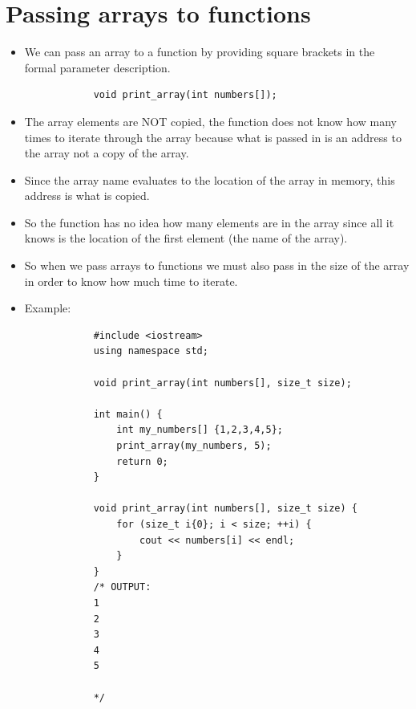 \section{Passing arrays to functions}
\begin{itemize}
    \item We can pass an array to a function by providing square brackets in the formal parameter description.
        \begin{verbatim}
            void print_array(int numbers[]);
        \end{verbatim}
    
    \item The array elements are NOT copied, the function does not know how many times to iterate through the array because what is passed in is an address to the array not a copy of the array.
    \item Since the array name evaluates to the location of the array in memory, this address is what is copied.
    \item So the function has no idea how many elements are in the array since all it knows is the location of the first element (the name of the array).
    \item So when we pass arrays to functions we must also pass in the size of the array in order to know how much time to iterate.
    \item Example:
        \begin{verbatim}
            #include <iostream>
            using namespace std;

            void print_array(int numbers[], size_t size);

            int main() {
                int my_numbers[] {1,2,3,4,5};
                print_array(my_numbers, 5);
                return 0;
            }

            void print_array(int numbers[], size_t size) {
                for (size_t i{0}; i < size; ++i) {
                    cout << numbers[i] << endl;
                }
            }
            /* OUTPUT:
            1
            2
            3
            4
            5

            */
        \end{verbatim}
    

\end{itemize}
